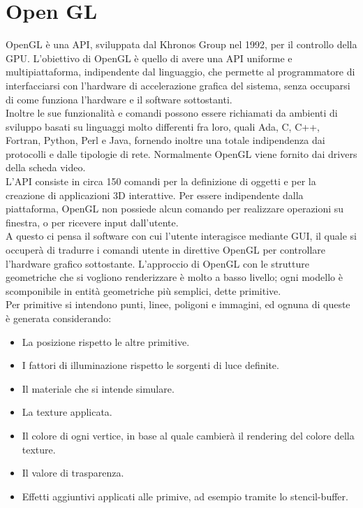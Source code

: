 \section{Open GL}
\label{sec:chapter_stato_arte_open_gl}

OpenGL è una API, sviluppata dal Khronos Group nel 1992, per il controllo della GPU. L’obiettivo di OpenGL è quello di avere una API uniforme e multipiattaforma, indipendente dal linguaggio, che permette al programmatore di interfacciarsi con l’hardware di accelerazione grafica del sistema, senza occuparsi di come funziona l’hardware e il software sottostanti.
\\
Inoltre le sue funzionalità e comandi possono essere richiamati da ambienti di sviluppo basati su linguaggi molto differenti fra loro, quali Ada, C, C++, Fortran, Python, Perl e Java, fornendo inoltre una totale indipendenza dai protocolli e dalle tipologie di rete. 
Normalmente OpenGL viene fornito dai drivers della scheda video.
\\
L’API consiste in circa 150 comandi per la definizione di oggetti e per la creazione di applicazioni 3D interattive. Per essere indipendente dalla piattaforma, OpenGL non possiede alcun comando per realizzare operazioni su finestra, o per ricevere input dall’utente.
\\ 
A questo ci pensa il software con cui l’utente interagisce mediante GUI, il quale si occuperà di tradurre i comandi utente in direttive OpenGL per controllare l’hardware grafico sottostante. 
L’approccio di OpenGL con le strutture geometriche che si vogliono renderizzare è molto a basso livello; ogni modello è scomponibile in entità geometriche più semplici, dette primitive.
\\
Per primitive si intendono punti, linee, poligoni e immagini, ed ognuna di queste è generata considerando:
\begin{itemize}
\item La posizione rispetto le altre primitive.
\item I fattori di illuminazione rispetto le sorgenti di luce definite.
\item Il materiale che si intende simulare.
\item La texture applicata.
\item Il colore di ogni vertice, in base al quale cambierà il rendering del colore della texture.
\item Il valore di trasparenza.
\item Effetti aggiuntivi applicati alle primive, ad esempio tramite lo stencil-buffer. 
\end{itemize}
